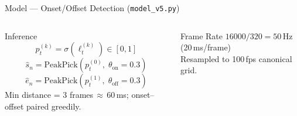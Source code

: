 \documentclass[aspectratio=169,9pt]{beamer}
\newcommand{\sh}{\hat{s}}
\newcommand{\eh}{\hat{e}}
\begin{document}
\begin{frame}{Model --- Onset/Offset Detection (\texttt{model\_v5.py})}
\begin{columns}[T]
      \begin{block}{Inference}
        \[
          p_t^{(k)} = \sigma\!\left(\ell_t^{(k)}\right) \in [0,1]
        \]
        \[
          \sh_n = \mathrm{PeakPick}\!\left(p_t^{(0)},\;\theta_\text{on}{=}0.3\right)
        \]
        \[
          \eh_n = \mathrm{PeakPick}\!\left(p_t^{(1)},\;\theta_\text{off}{=}0.3\right)
        \]
        \footnotesize Min distance = 3 frames\,$\approx$\,60\,ms;
        onset--offset paired greedily.
      \end{block}
      \vspace{4pt}
      \begin{exampleblock}{Frame Rate}
        \small $16000 / 320 = 50$\,Hz (20\,ms/frame)\\
        Resampled to 100\,fps canonical grid.
      \end{exampleblock}
  \end{columns}
\end{frame}
\end{document}
